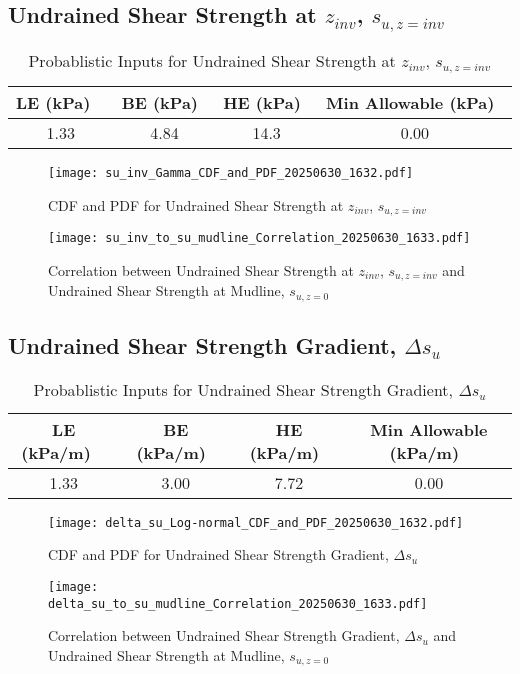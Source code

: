 \documentclass{article}
\begin{document}
\subsection*{Undrained Shear Strength at $z_{inv}$, $s_{{u,z=inv}}$}
\begin{table}[h!]
\centering
\caption{Probablistic Inputs for Undrained Shear Strength at $z_{inv}$, $s_{{u,z=inv}}$}
\begin{tabular}{|c|c|c|c|}
\hline
LE (kPa) \ & BE (kPa)\ & HE (kPa)\ & Min Allowable (kPa)\ \\
\hline
1.33 & 4.84 & 14.3 & 0.00 \\
\hline
\end{tabular}
\end{table}
\begin{figure}[h!]
\centering
\texttt{[image: su\_inv\_Gamma\_CDF\_and\_PDF\_20250630\_1632.pdf]}
\caption{CDF and PDF for Undrained Shear Strength at $z_{inv}$, $s_{{u,z=inv}}$}
\end{figure}
\begin{figure}[h!]
\centering
\texttt{[image: su\_inv\_to\_su\_mudline\_Correlation\_20250630\_1633.pdf]}
\caption{Correlation between Undrained Shear Strength at $z_{inv}$, $s_{{u,z=inv}}$ and Undrained Shear Strength at Mudline, $s_{{u,z=0}}$}
\end{figure}
\clearpage
\subsection*{Undrained Shear Strength Gradient, $\Delta s_{u}$}
\begin{table}[h!]
\centering
\caption{Probablistic Inputs for Undrained Shear Strength Gradient, $\Delta s_{u}$}
\begin{tabular}{|c|c|c|c|}
\hline
LE (kPa/m) \ & BE (kPa/m)\ & HE (kPa/m)\ & Min Allowable (kPa/m)\ \\
\hline
1.33 & 3.00 & 7.72 & 0.00 \\
\hline
\end{tabular}
\end{table}
\begin{figure}[h!]
\centering
\texttt{[image: delta\_su\_Log-normal\_CDF\_and\_PDF\_20250630\_1632.pdf]}
\caption{CDF and PDF for Undrained Shear Strength Gradient, $\Delta s_{u}$}
\end{figure}
\begin{figure}[h!]
\centering
\texttt{[image: delta\_su\_to\_su\_mudline\_Correlation\_20250630\_1633.pdf]}
\caption{Correlation between Undrained Shear Strength Gradient, $\Delta s_{u}$ and Undrained Shear Strength at Mudline, $s_{{u,z=0}}$}
\end{figure}
\clearpage
\end{document}
